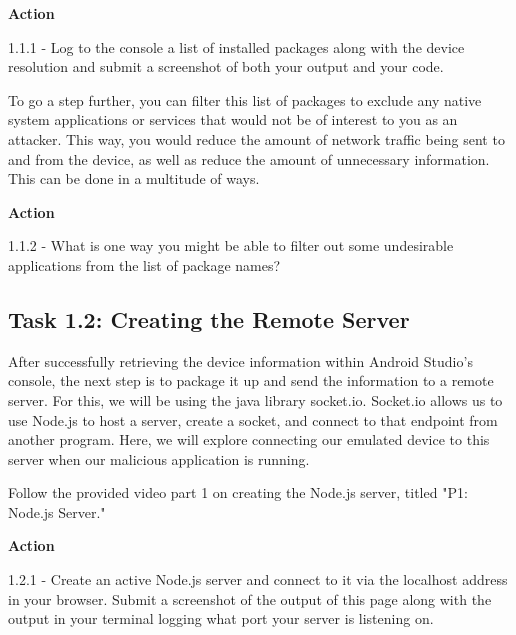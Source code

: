 \documentclass[letterpaper,12pt]{report}
\begin{document}
\bigskip
\begin{mdframed}[backgroundcolor=blue!10,style=code,nobreak=true,align=center,userdefinedwidth=14cm]
\textbf{Action}
\bigskip

1.1.1 - Log to the console a list of installed packages along with the device resolution and submit a screenshot of both your output and your code.
\end{mdframed}

To go a step further, you can filter this list of packages to exclude any native system applications or services that would not be of interest to you as an attacker. This way, you would reduce the amount of network traffic being sent to and from the device, as well as reduce the amount of unnecessary information. This can be done in a multitude of ways.

\bigskip
\begin{mdframed}[backgroundcolor=blue!10,style=code,nobreak=true,align=center,userdefinedwidth=14cm]
\textbf{Action}
\bigskip

1.1.2 - What is one way you might be able to filter out some undesirable applications from the list of package names?
\end{mdframed}

\subsection*{Task 1.2: Creating the Remote Server}\label{sec:Task-1.2-Creating-the-Remote-Server}

After successfully retrieving the device information within Android Studio’s console, the next step is to package it up and send the information to a remote server. For this, we will be using the java library socket.io. Socket.io allows us to use Node.js to host a server, create a socket, and connect to that endpoint from another program. Here, we will explore connecting our emulated device to this server when our malicious application is running. 

Follow the provided video part 1 on creating the Node.js server, titled "P1: Node.js Server."

\bigskip
\begin{mdframed}[backgroundcolor=blue!10,style=code,nobreak=true,align=center,userdefinedwidth=14cm]
\textbf{Action}
\bigskip

1.2.1 - Create an active Node.js server and connect to it via the localhost address in your browser. Submit a screenshot of the output of this page along with the output in your terminal logging what port your server is listening on.
\end{mdframed}
\end{document}
